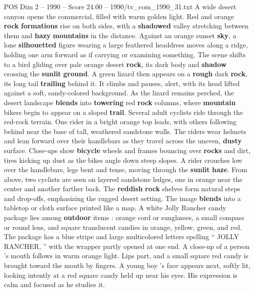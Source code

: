 \begin{textsample}{POS Dim 2 – 1990 – Score 24.00 – 1990/tv\_com\_1990\_31.txt}  \label{ex:f2_pos_032}
A wide desert canyon opens the commercial, filled with warm golden light.
Red and orange \textbf{rock} \textbf{formations} rise on both sides, with a \textbf{shadowed} valley stretching between them and \textbf{hazy} \textbf{mountains} in the distance.
Against an orange sunset \textbf{sky}, a lone \textbf{silhouetted} figure wearing a large feathered headdress moves along a ridge, holding one arm forward as if carrying or examining something.
The scene shifts to a bird gliding over pale orange desert \textbf{rock}, its dark body and \textbf{shadow} crossing the \textbf{sunlit} \textbf{ground}.
A green lizard then appears on a \textbf{rough} dark \textbf{rock}, its long tail \textbf{trailing} behind it.
It climbs and pauses, alert, with its head lifted against a soft, sandy-colored background.
As the lizard remains perched, the desert landscape \textbf{blends} into \textbf{towering} red \textbf{rock} columns, where \textbf{mountain} bikers begin to appear on a sloped \textbf{trail}.
Several adult cyclists ride through the red-rock terrain.
One rider in a bright orange top leads, with others following behind near the base of tall, weathered sandstone walls.
The riders wear helmets and lean forward over their handlebars as they travel across the uneven, \textbf{dusty} surface.
Close-ups show \textbf{bicycle} wheels and frames bouncing over \textbf{rocks} and dirt, tires kicking up dust as the bikes angle down steep slopes.
A rider crouches low over the handlebars, legs bent and tense, moving through the \textbf{sunlit} \textbf{haze}.
From above, two cyclists are seen on layered sandstone ledges, one in orange near the center and another farther back.
The \textbf{reddish} \textbf{rock} shelves form natural steps and drop-offs, emphasizing the rugged desert setting.
The image \textbf{blends} into a tabletop or cloth surface printed like a map.
A white Jolly Rancher candy package lies among \textbf{outdoor} items : orange cord or sunglasses, a small compass or round lens, and square translucent candies in orange, yellow, green, and red.
The package has a blue stripe and large multicolored letters spelling “ JOLLY RANCHER, ” with the wrapper partly opened at one end.
A close-up of a person ’s mouth follows in warm orange light.
Lips part, and a small square red candy is brought toward the mouth by fingers.
A young boy ’s face appears next, softly lit, looking intently at a red square candy held up near his eyes.
His expression is calm and focused as he studies it.

\end{textsample}
